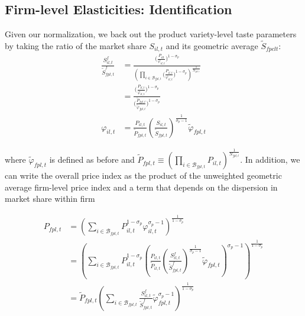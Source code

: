 \subsection{Firm-level Elasticities: Identification}\label{app:theory_residuals_instrument}
Given our normalization, we back out the product variety-level taste parameters by taking the ratio of the market share $S_{il,t}$ and its geometric average $\tilde{S}_{fpclt}$: 
\begin{equation*}
    \begin{aligned}
        \frac{S^f_{il,t}}{\tilde{S}^f_{fpl,t}} 
            &=  \frac{\bigg(\frac{P_{ilt}}{\varphi_{il,t}}\bigg)^{1-\sigma_p}}
                     {  \left(
                            \prod_{i \in \mathcal{B}_{fpl,t}} \bigg(\frac{P_{il,t}}{\varphi_{il,t}}\bigg)^{1-\sigma_p}
                        \right)^{\frac{1}{N_{fpl,t}}}} \\
            &=  \frac{\bigg(\frac{P_{il,t}}{\varphi_{il,t}}\bigg)^{1-\sigma_p}}
                     {\bigg(\frac{\tilde{P}_{fpl,t}}{\tilde{\varphi}_{fpl,t}}\bigg)^{1-\sigma_p}} \\
        \varphi_{il,t} 
            &=  \frac{P_{il,t}}{\tilde{P}_{fpl,t}}  
                \left(\frac{S_{il,t}}{\tilde{S}_{fpl,t}}\right)^{\frac{1}{\sigma_p-1}} 
                \tilde{\varphi}_{fpl,t}
    \end{aligned}
\end{equation*}

\noindent where $\tilde{\varphi}_{fpl,t}$ is defined as before and $\tilde{P}_{fpl,t} \equiv \left(\prod_{i \in \mathcal{B}_{fpl,t}} P_{il,t}\right)^{\frac{1}{N_{fpl,t}}}$. In addition, we can write the overall price index as the product of the unweighted geometric average firm-level price index and a term that depends on the dispersion in market share within firm 

\begin{equation*}
    \begin{aligned}
       P_{fpl,t}   &=   \left(
                            \sum_{i \in \mathcal{B}_{fpl,t}} P_{il,t}^{1-\sigma_p} \varphi_{il,t}^{\sigma_p-1} 
                        \right)^{\frac{1}{1-\sigma_p}} \\
                    &=  \left(\sum_{i \in \mathcal{B}_{fpl,t}} P_{il,t}^{1-\sigma_p}
                                \left(\frac{P_{il,t}}{\tilde{P}_{il,t}}  
                                    \left(\frac{S^f_{il,t}}{\tilde{S}^f_{fpl,t}}\right)^{\frac{1}{\sigma_p-1}} \tilde{\varphi}_{fpl,t}
                                \right)^{\sigma_p-1} 
                        \right)^{\frac{1}{1-\sigma_p}} \\
                    &=  \tilde{P}_{fpl,t} 
                        \left(
                            \sum_{i \in \mathcal{B}_{fpl,t}} \frac{S^f_{il,t}}{\tilde{S}^f_{fpl,t}} 
                            \tilde{\varphi}_{fpl,t}^{\sigma_p-1}
                        \right)^{\frac{1}{1-\sigma_p}}
    \end{aligned}
\end{equation*}

